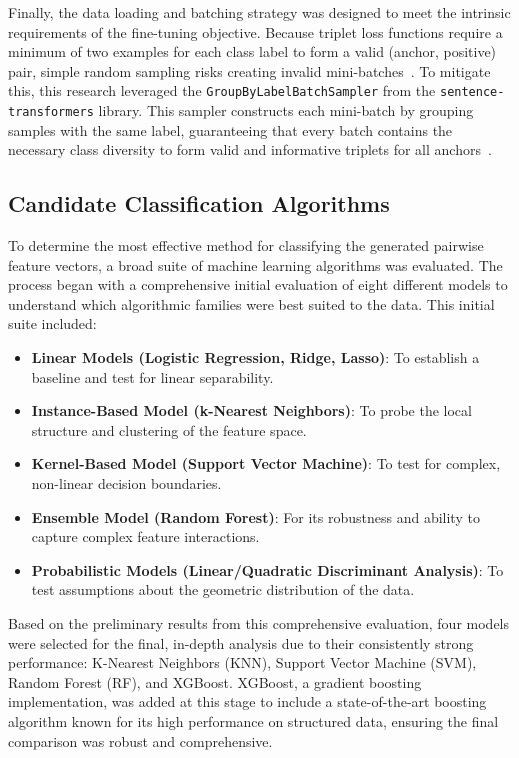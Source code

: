 Finally, the data loading and batching strategy was designed to meet the intrinsic requirements of the fine-tuning objective. Because triplet loss functions require a minimum of two examples for each class label to form a valid (anchor, positive) pair, simple random sampling risks creating invalid mini-batches~\cite{sbertLosses}. To mitigate this, this research leveraged the \verb|GroupByLabelBatchSampler| from the \verb|sentence-transformers| library. This sampler constructs each mini-batch by grouping samples with the same label, guaranteeing that every batch contains the necessary class diversity to form valid and informative triplets for all anchors~\cite{sbertSamplers}.

\subsection{Candidate Classification Algorithms}\label{ch:3.3.2}
To determine the most effective method for classifying the generated pairwise feature vectors, a broad suite of machine learning algorithms was evaluated. The process began with a comprehensive initial evaluation of eight different models to understand which algorithmic families were best suited to the data. This initial suite included:
\begin{itemize}
    \item \textbf{Linear Models (Logistic Regression, Ridge, Lasso)}: To establish a baseline and test for linear separability.
    \item \textbf{Instance-Based Model (k-Nearest Neighbors)}: To probe the local structure and clustering of the feature space.
    \item \textbf{Kernel-Based Model (Support Vector Machine)}: To test for complex, non-linear decision boundaries.
    \item \textbf{Ensemble Model (Random Forest)}: For its robustness and ability to capture complex feature interactions.
    \item \textbf{Probabilistic Models (Linear/Quadratic Discriminant Analysis)}: To test assumptions about the geometric distribution of the data.
\end{itemize}
Based on the preliminary results from this comprehensive evaluation, four models were selected for the final, in-depth analysis due to their consistently strong performance: K-Nearest Neighbors (KNN), Support Vector Machine (SVM), Random Forest (RF), and XGBoost. XGBoost, a gradient boosting implementation, was added at this stage to include a state-of-the-art boosting algorithm known for its high performance on structured data, ensuring the final comparison was robust and comprehensive.

